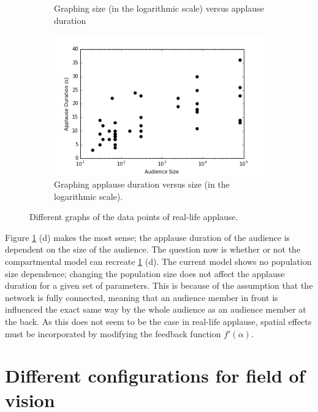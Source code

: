 \begin{figure}[h]
\begin{subfigure}[b]{0.4\linewidth}
    \caption{Graphing size (in the logarithmic scale) versus applause duration}
  \end{subfigure}
    \begin{subfigure}[b]{0.4\linewidth}
    \includegraphics[width=\linewidth]{images/chapter4/4.png}
    \caption{Graphing applause duration versus size (in the logarithmic scale).}
  \end{subfigure}
  \caption{Different graphs of the data points of real-life applause.}
  \label{fig:realclap}
\end{figure}

Figure \ref{fig:realclap} (d) makes the most sense; the applause duration of the audience is dependent on the size of the audience.
The question now is whether or not the compartmental model can recreate \ref{fig:realclap} (d).
The current model shows no population size dependence; changing the population size does not affect the applause duration for a given set of parameters.
This is because of the assumption that the network is fully connected, meaning that an audience member in front is influenced the exact same way by the whole audience as an audience member at the back.
As this does not seem to be the case in real-life applause, spatial effects must be incorporated by modifying the feedback function $f'(\alpha)$.

\section{Different configurations for field of vision}

